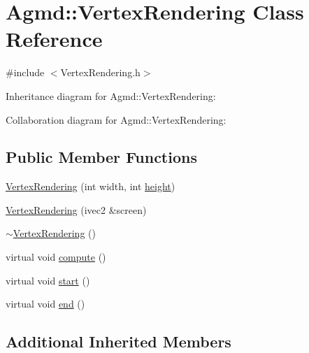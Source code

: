 \hypertarget{class_agmd_1_1_vertex_rendering}{\section{Agmd\+:\+:Vertex\+Rendering Class Reference}
\label{class_agmd_1_1_vertex_rendering}
}


{\ttfamily \#include $<$Vertex\+Rendering.\+h$>$}



Inheritance diagram for Agmd\+:\+:Vertex\+Rendering\+:


Collaboration diagram for Agmd\+:\+:Vertex\+Rendering\+:
\subsection*{Public Member Functions}
\begin{DoxyCompactItemize}
\item 
\hyperlink{class_agmd_1_1_vertex_rendering_af82c35c66577696f1ac8968ec66539e6}{Vertex\+Rendering} (int width, int \hyperlink{_examples_2_bezier_2_app_8cpp_a48083b65ac9a863566dc3e3fff09a5b4}{height})
\item 
\hyperlink{class_agmd_1_1_vertex_rendering_a5ef8f3f125d66bd5ea71b2a0c6c4394b}{Vertex\+Rendering} (ivec2 \&screen)
\item 
\hyperlink{class_agmd_1_1_vertex_rendering_aaecbb490d6723ca4d09a7e1d9a53628d}{$\sim$\+Vertex\+Rendering} ()
\item 
virtual void \hyperlink{class_agmd_1_1_vertex_rendering_a380d35675521fa7b1b739c1c1214c882}{compute} ()
\item 
virtual void \hyperlink{class_agmd_1_1_vertex_rendering_ac03dd545b910070c14d4c478e2c6d936}{start} ()
\item 
virtual void \hyperlink{class_agmd_1_1_vertex_rendering_accf6f94aa1d549e225c8ca28607b35e0}{end} ()
\end{DoxyCompactItemize}
\subsection*{Additional Inherited Members}


